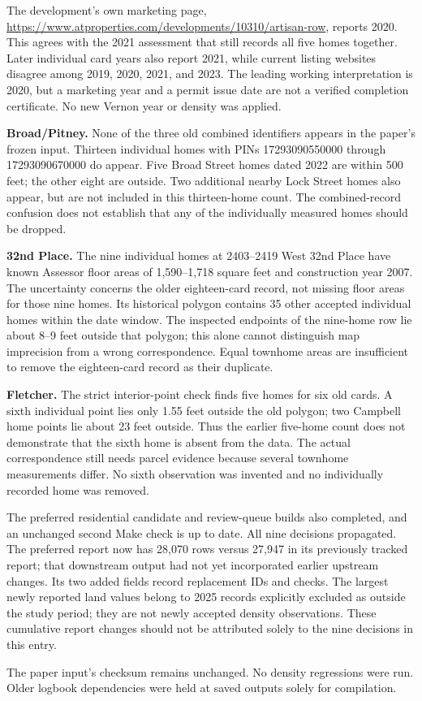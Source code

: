 The development's own marketing page, \url{https://www.atproperties.com/developments/10310/artisan-row},
reports 2020. This agrees with the 2021 assessment that still records all five
homes together. Later individual card years also report 2021, while current
listing websites disagree among 2019, 2020, 2021, and 2023. The leading working
interpretation is 2020, but a marketing year and a permit issue date are not a
verified completion certificate. No new Vernon year or density was applied.

\textbf{Broad/Pitney.} None of the three old combined identifiers appears in the
paper's frozen input. Thirteen individual homes with PINs 17293090550000 through
17293090670000 do appear. Five Broad Street homes dated 2022 are within 500 feet;
the other eight are outside. Two additional nearby Lock Street homes also appear,
but are not included in this thirteen-home count. The combined-record confusion
does not establish that any of the individually measured homes should be dropped.

\textbf{32nd Place.} The nine individual homes at 2403--2419 West 32nd Place
have known Assessor floor areas of 1,590--1,718 square feet and construction year
2007. The uncertainty concerns the older eighteen-card record, not missing floor
areas for those nine homes. Its historical polygon contains 35 other accepted
individual homes within the date window. The inspected endpoints of the nine-home
row lie about 8--9 feet outside that polygon; this alone cannot distinguish map
imprecision from a wrong correspondence. Equal townhome areas are insufficient
to remove the eighteen-card record as their duplicate.

\textbf{Fletcher.} The strict interior-point check finds five homes for six old
cards. A sixth individual point lies only 1.55 feet outside the old polygon;
two Campbell home points lie about 23 feet outside. Thus the earlier five-home
count does not demonstrate that the sixth home is absent from the data. The
actual correspondence still needs parcel evidence because several townhome
measurements differ. No sixth observation was invented and no individually
recorded home was removed.

The preferred residential candidate and review-queue builds also completed,
and an unchanged second Make check is up to date. All nine decisions propagated.
The preferred report now has 28,070 rows versus 27,947 in its previously tracked
report; that downstream output had not yet incorporated earlier upstream changes.
Its two added fields record replacement IDs and checks. The largest newly reported
land values belong to 2025 records explicitly excluded as outside the study period;
they are not newly accepted density observations. These cumulative report changes
should not be attributed solely to the nine decisions in this entry.

The paper input's checksum remains unchanged. No density regressions were run.
Older logbook dependencies were held at saved outputs solely for compilation.
